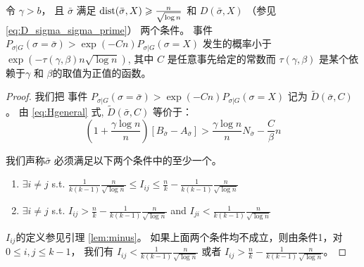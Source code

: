   \begin{lemma}\label{lem:sigmaX}
    令 $\gamma > b$， 且 $\bar{\sigma}$ 满足 $\operatorname{dist}(\bar{\sigma}, X) \geqslant \frac{n}{\sqrt{\log n}}$
    和 $D(\bar{\sigma}, X)$
    （参见\eqref{eq:D_sigma_sigma_prime}）
    两个条件。
    事件
    $P_{\sigma | G}(\sigma = \bar{\sigma} ) > \exp(-Cn) P_{\sigma | G}(\sigma = X)$
    发生的概率小于 $\exp(-\tau(\gamma,\beta) n \sqrt{\log  n} )$,
    其中 $C$ 是任意事先给定的常数而 
    $\tau(\gamma,\beta)$
   是某个依赖于$\gamma$ 和 $\beta$的取值为正值的函数。
  \end{lemma}
  \begin{proof}
    我们把 事件 $P_{\sigma | G}(\sigma = \bar{\sigma} ) > \exp(-Cn) P_{\sigma | G}(\sigma = X)$
    记为 $\widetilde{D}(\bar{\sigma}, C)$。
    由 \eqref{eq:Hgeneral} 式, $\widetilde{D}(\bar{\sigma}, C)$
    等价于：
  \begin{equation}\label{eq:BwA}
    (1 + \frac{\gamma \log n}{n})[B_{\bar{\sigma}} - A_{\bar{\sigma}}] >  \frac{\gamma \log n}{n} N_{\bar{\sigma}}  - \frac{C}{\beta} n
    \end{equation}  
    
    我们声称$\bar{\sigma}$  必须满足以下两个条件中的至少一个。
    \begin{enumerate}
      \item $\exists i\neq j$ s.t. $\frac{1}{k(k-1)}\frac{n}{\sqrt{\log n}} \leq I_{ij} \leq \frac{n}{k} - \frac{1}{k(k-1)}\frac{n}{\sqrt{\log n}}$
      \item $\exists i \neq j$ s.t. $I_{ij} > \frac{n}{k} - \frac{1}{k(k-1)}\frac{n}{\sqrt{\log n}}$ and $I_{ji} < \frac{1}{k(k-1)}\frac{n}{\sqrt{\log n}}$
    \end{enumerate}
    $I_{ij}$的定义参见引理
    \ref{lem:minus}。
    如果上面两个条件均不成立，则由条件1，对 $0 \leq i,j\leq k-1$，
    我们有
    $I_{ij} < \frac{1}{k(k-1)}\frac{n}{\sqrt{\log n}}$
    或者 $I_{ij} > \frac{n}{k} - \frac{1}{k(k-1)}\frac{n}{\sqrt{\log n}}$。
    

\end{proof}
